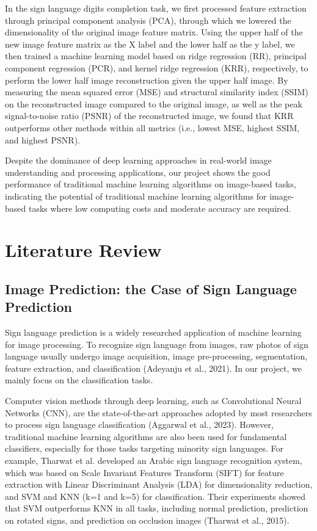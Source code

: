 \documentclass{article}
\begin{document}
In the sign language digits completion task, we first processed feature extraction through principal component analysis (PCA), through which we lowered the dimensionality of the original image feature matrix. Using the upper half of the new image feature matrix as the X label and the lower half as the y label, we then trained a machine learning model based on ridge regression (RR), principal component regression (PCR), and kernel ridge regression (KRR), respectively, to perform the lower half image reconstruction given the upper half image. By measuring the mean squared error (MSE) and structural similarity index (SSIM) on the reconstructed image compared to the original image, as well as the peak signal-to-noise ratio (PSNR) of the reconstructed image, we found that KRR outperforms other methods within all metrics (i.e., lowest MSE, highest SSIM, and highest PSNR).

Despite the dominance of deep learning approaches in real-world image understanding and processing applications, our project shows the good performance of traditional machine learning algorithms on image-based tasks, indicating the potential of traditional machine learning algorithms for image-based tasks where low computing costs and moderate accuracy are required.

\section{Literature Review}
\subsection{Image Prediction: the Case of Sign Language Prediction}
Sign language prediction is a widely researched application of machine learning for image processing. To recognize sign language from images, raw photos of sign language usually undergo image acquisition, image pre-processing, segmentation, feature extraction, and classification (Adeyanju et al., 2021). In our project, we mainly focus on the classification tasks.

Computer vision methods through deep learning, such as Convolutional Neural Networks (CNN), are the state-of-the-art approaches adopted by most researchers to process sign language classification (Aggarwal et al., 2023). However, traditional machine learning algorithms are also been used for fundamental classifiers, especially for those tasks targeting minority sign languages. For example, Tharwat et al. developed an Arabic sign language recognition system, which was based on Scale Invariant Features Transform
(SIFT) for feature extraction with Linear Discriminant Analysis (LDA) for dimensionality reduction, and SVM and KNN (k=1 and k=5) for classification. Their experiments showed that SVM outperforms KNN in all tasks, including normal prediction, prediction on rotated signs, and prediction on occlusion images (Tharwat et al., 2015).
\end{document}

